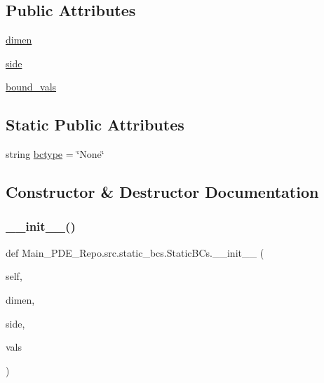 \subsection*{Public Attributes}
\begin{DoxyCompactItemize}
\item 
\hyperlink{classMain__PDE__Repo_1_1src_1_1static__bcs_1_1StaticBCs_ad2f589646d3cbb6c43747d26802ca239}{dimen}
\item 
\hyperlink{classMain__PDE__Repo_1_1src_1_1static__bcs_1_1StaticBCs_a4f88c825d9bf611f48678b0d606e24e2}{side}
\item 
\hyperlink{classMain__PDE__Repo_1_1src_1_1static__bcs_1_1StaticBCs_a2dfb5aec6e0993299c6c012f6a8b3304}{bound\+\_\+vals}
\end{DoxyCompactItemize}
\subsection*{Static Public Attributes}
\begin{DoxyCompactItemize}
\item 
string \hyperlink{classMain__PDE__Repo_1_1src_1_1static__bcs_1_1StaticBCs_afbdd530a3a47d370c99b30eed8bb0644}{bctype} = \char`\"{}None\char`\"{}
\end{DoxyCompactItemize}


\subsection{Constructor \& Destructor Documentation}
\mbox{\label{classMain__PDE__Repo_1_1src_1_1static__bcs_1_1StaticBCs_a9231c3b0dd3e4263e453d0ba4211dee3}} 
\subsubsection{\texorpdfstring{\+\_\+\+\_\+init\+\_\+\+\_\+()}{\_\_init\_\_()}}
{\footnotesize\ttfamily def Main\+\_\+\+P\+D\+E\+\_\+\+Repo.\+src.\+static\+\_\+bcs.\+Static\+B\+Cs.\+\_\+\+\_\+init\+\_\+\+\_\+ (\begin{DoxyParamCaption}\item[{}]{self,  }\item[{}]{dimen,  }\item[{}]{side,  }\item[{}]{vals }\end{DoxyParamCaption})}



